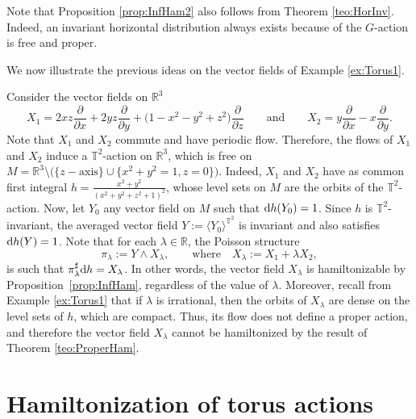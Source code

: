 \documentclass[pdftex]{sigma}%
\newcommand{\R}[1]{\mathbb{R}^{#1}}
\newcommand{\dd}{{\rm d}}
\numberwithin{equation}{section}
\begin{document}
\begin{Remark}
Note that Proposition \ref{prop:InfHam2} also follows from Theorem \ref{teo:HorInv}. Indeed, an invariant horizontal distribution always exists because of the $G$-action is free and proper.
\end{Remark}

We now illustrate the previous ideas on the vector fields of Example \ref{ex:Torus1}.

\begin{Example}\label{ex:Torus2}
Consider the vector fields on $\R{3}$
 \begin{equation*}
 X_{1} = 2xz\frac{\partial}{\partial x} + 2yz\frac{\partial}{\partial y} + \big(1-x^2-y^2+z^2\big)\frac{\partial}{\partial z} \qquad \text{and} \qquad
 X_{2} = y\frac{\partial}{\partial x} - x\frac{\partial}{\partial y}.
 \end{equation*}
Note that $X_1$ and $X_2$ commute and have periodic flow. Therefore, the flows of $X_1$ and $X_2$ induce a $\mathbb{T}^2$-action on $\R{3}$, which is free on $M = \R{3} \setminus \big(\{z-\text{axis}\}\cup\big\{x^2+y^2=1, z = 0\big\}\big)$. Indeed, $X_1$ and $X_2$ have as common first integral $h = \frac{x^2+y^2}{(x^2+y^2+z^2+1)^2}$, whose level sets on $M$ are the orbits of the $\mathbb{T}^2$-action. Now, let $Y_{0}$ any vector field on $M$ such that $\dd h(Y_{0}) = 1$. Since $h$ is $\mathbb{T}^2$-invariant, the averaged vector field $Y := \langle Y_{0}\rangle^{\mathbb{T}^2}$ is invariant and also satisfies $\dd h(Y) = 1$. Note that for each $\lambda \in \mathbb{R}$, the Poisson structure
 \begin{equation*}
 \pi_{\lambda} := Y\wedge X_{\lambda}, \qquad \text{where}\quad X_{\lambda} := X_1 + \lambda X_2,
 \end{equation*}
is such that $\pi_{\lambda}^{\sharp}\dd h = X_{\lambda}$. In other words, the vector field $X_{\lambda}$ is hamiltonizable by Proposition~\ref{prop:InfHam}, regardless of the value of $\lambda$. Moreover, recall from Example \ref{ex:Torus1} that if $\lambda$ is irrational, then the orbits of $X_{\lambda}$ are dense on the level sets of $h$, which are compact. Thus, its flow does not define a proper action, and therefore the vector field $X_{\lambda}$ cannot be hamiltonized by the result of Theorem \ref{teo:ProperHam}.
\end{Example}


 \section{Hamiltonization of torus actions}
\end{document}
